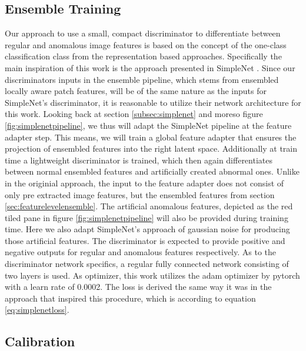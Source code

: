 \subsection{Ensemble Training}
\label{sec:discriminator}
Our approach to use a small, compact discriminator to differentiate between regular and anomalous image features is based on the concept of 
the one-class classification class from the representation based approaches. Specifically the main inspiration of this work is the approach 
presented in SimpleNet \cite{liu2023simplenet}. Since our discriminators inputs in the ensemble pipeline, which stems from ensembled locally aware patch features, 
will be of the same nature as 
the inputs for SimpleNet's discriminator, it is reasonable to utilize their network architecture for this work. Looking back at section 
\ref{subsec:simplenet} and moreso figure \ref{fig:simplenetpipeline}, we thus will adapt the SimpleNet pipeline at the feature adapter step. 
This means, we will train a global feature adapter that ensures the projection of ensembled features into the right latent space. Additionally at train time a lightweight discriminator 
is trained, which then again differentiates between normal ensembled features and artificially created abnormal ones. Unlike in the originial approach, the input to the feature adapter 
does not consist of only pre extracted image features, 
but the ensembled features from section \ref{sec:featurelevelensemble}. The artificial anomalous features, 
depicted as the red tiled pane in figure \ref{fig:simplenetpipeline} will also be provided during training time. Here we also adapt SimpleNet's approach of 
gaussian noise for producing those artificial features. %
The discriminator is expected to provide positive and negative outputs for regular and anomalous features respectively.
As to the discriminator network specifics, a regular fully connected network consisting of two layers is used. As optimizer, this work utilizes the 
adam optimizer by pytorch with a learn rate of 0.0002. The loss is derived the same way it was in the approach that inspired this procedure, 
which is according to equation \ref{eq:simplenetloss}.


\subsection{Calibration}
\label{sec:Calibration}

